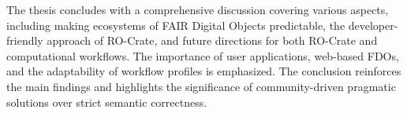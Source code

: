 The thesis concludes with a comprehensive discussion covering various aspects, including making ecosystems of FAIR Digital Objects predictable, the developer-friendly approach of RO-Crate, and future directions for both RO-Crate and computational workflows. The importance of user applications, web-based FDOs, and the adaptability of workflow profiles is emphasized. The conclusion reinforces the main findings and highlights the significance of community-driven pragmatic solutions over strict semantic correctness.
%
%
%
%
%
%
%
